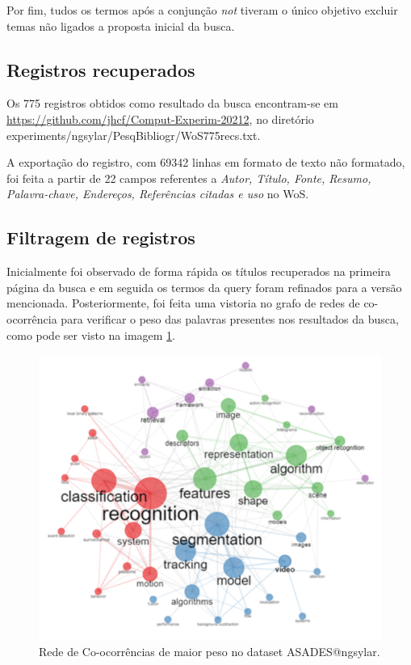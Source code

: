 Por fim, tudos os termos após a conjunção \textit{not} tiveram o único objetivo excluir temas não ligados a proposta inicial da busca.

\subsection{Registros recuperados}
Os 775 registros obtidos como resultado da busca encontram-se em \url{https://github.com/jhcf/Comput-Experim-20212}, no diretório {experiments/ngsylar/PesqBibliogr/WoS775recs.txt}.

A exportação do registro, com 69342 linhas em formato de texto não formatado, foi feita a partir de 22 campos referentes a \textit{Autor, Título, Fonte, Resumo, Palavra-chave, Endereços, Referências citadas e uso} no WoS.

\subsection{Filtragem de registros}
Inicialmente foi observado de forma rápida os títulos recuperados na primeira página da busca e em seguida os termos da query foram refinados para a versão mencionada.
Posteriormente, foi feita uma vistoria no grafo de redes de co-ocorrência para verificar o peso das palavras presentes nos resultados da busca, como pode ser visto na imagem \ref{fig:evol:anual:cotonet:ASADES@ngsylar}.

\begin{figure}[H]
    \centering
    \includegraphics[width=1\textwidth]{experiments/ngsylar/PesqBibliogr/Imagens/ASADES-CoOccurrenceNetwork.png}
    \caption{Rede de Co-ocorrências de maior peso no dataset ASADES@ngsylar.}
    \label{fig:evol:anual:cotonet:ASADES@ngsylar}
\end{figure}

